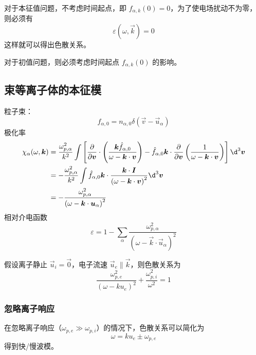 对于本征值问题，不考虑时间起点，即 $f_{\alpha,k}(0) = 0$，为了使电场扰动不为零，则必须有
\begin{equation}
\varepsilon(\omega, \vec{k}) = 0
\end{equation}
这样就可以得出色散关系。

对于初值问题，则必须考虑时间起点 $f_{\alpha,k}(0)$ 的影响。

\subsection{束等离子体的本征模}

粒子束：
\begin{equation}
f_{\alpha,0} = n_{\alpha,0} \delta(\vec{v} - \vec{u}_\alpha)
\end{equation}
极化率
\begin{equation}\begin{aligned}
\chi_\alpha(\omega, \vec{k}) &= \frac{\omega_{p,\alpha}^2}{k^2} \int \left[
\pdv{}{\vec{v}} \cdot \left( \frac{\vec{k} \hat{f}_{\alpha,0}}{\omega - \vec{k} \cdot \vec{v}} \right)
- \hat{f}_{\alpha,0} \vec{k} \cdot \pdv{}{\vec{v}}\left( \frac{1}{\omega - \vec{k} \cdot \vec{v}} \right)
\right] \d^3 \vec{v} \\
&= - \frac{\omega_{p,\alpha}^2}{k^2} \int
\hat{f}_{\alpha,0} \vec{k} \cdot \frac{\vec{k} \cdot \vec{I}}{\left( \omega - \vec{k} \cdot \vec{v} \right)^2}
\d^3 \vec{v} \\
&= - \frac{\omega_{p,\alpha}^2}{\left( \omega - \vec{k} \cdot \vec{u}_\alpha \right)^2}
\end{aligned}\end{equation}
相对介电函数
\begin{equation}
\varepsilon = 1 - \sum_\alpha \frac{\omega_{p,\alpha}^2}{\left( \omega - \vec{k} \cdot \vec{u}_\alpha \right)^2}
\end{equation}

假设离子静止 $\vec{u}_i = \vec{0}$，电子流速 $\vec{u}_e \parallel \vec{k}$，则色散关系为
\begin{equation}
\frac{\omega_{p,e}^2}{\left( \omega - k u_e \right)^2} + \frac{\omega_{p,i}^2}{\omega^2} = 1
\end{equation}

\subsubsection{忽略离子响应}

在忽略离子响应（$\omega_{p,e} \gg \omega_{p,i}$）的情况下，色散关系可以简化为
\begin{equation}
\omega = k u_e \pm \omega_{p,e}
\end{equation}
得到快/慢波模。

